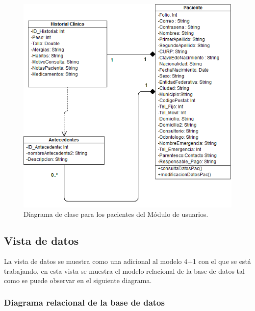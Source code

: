 \begin{figure}[H]
\centering
\includegraphics[width=16cm,keepaspectratio]{pictures/DiagramaClases_Paciente_Prototipo1.png}
\caption{Diagrama de clase para los pacientes del Módulo de usuarios.}
\end{figure}


\newpage
\subsection{Vista de datos}
La vista de datos se muestra como una adicional al modelo 4+1 con el que se está trabajando, en esta vista se muestra el modelo relacional de la base de datos tal como se puede observar en el siguiente diagrama.

\newpage
\subsubsection{Diagrama relacional de la base de datos}



\begin{minipage}{\textwidth}

\end{minipage}
\newpage
\begin{minipage}{\textwidth}

\end{minipage}
\newpage
\begin{minipage}{\textwidth}

\end{minipage}



